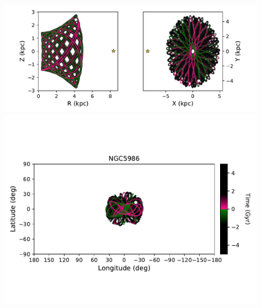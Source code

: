             \begin{figure}
                \begin{center}
                    \includegraphics[clip=true, trim = 0mm 2mm 0mm 0mm, width=\columnwidth]{images/PII_individual_NGC5986_NGC5986orbitRZXY.pdf}
                    \includegraphics[clip=true, trim = 0mm 20mm 0mm 10mm, width=\columnwidth]{images/PII_individual_NGC5986_NGC5986orbit.pdf}
                    

\end{center}
\end{figure}
